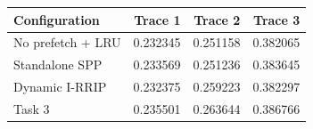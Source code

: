 \begin{tabular}{lrrr}
\toprule
Configuration & Trace 1 & Trace 2 & Trace 3 \\
\midrule
No prefetch + LRU & 0.232345 & 0.251158 & 0.382065 \\
Standalone SPP & 0.233569 & 0.251236 & 0.383645 \\
Dynamic I-RRIP & 0.232375 & 0.259223 & 0.382297 \\
Task 3 & 0.235501 & 0.263644 & 0.386766 \\
\bottomrule
\end{tabular}
